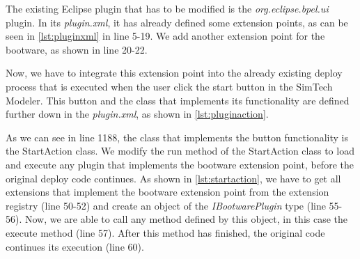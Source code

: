 The existing Eclipse plugin that has to be modified is the \textit{org.eclipse.bpel.ui} plugin.
In its \textit{plugin.xml}, it has already defined some extension points, as can be seen in \autoref{lst:pluginxml} in line 5-19.
We add another extension point for the bootware, as shown in line 20-22.

\vspace*{\baselineskip}

Now, we have to integrate this extension point into the already existing deploy process that is executed when the user click the start button in the SimTech Modeler.
This button and the class that implements its functionality are defined further down in the \textit{plugin.xml}, as shown in \autoref{lst:pluginaction}.

\vspace*{\baselineskip}

As we can see in line 1188, the class that implements the button functionality is the StartAction class.
We modify the run method of the StartAction class to load and execute any plugin that implements the bootware extension point, before the original deploy code continues.
As shown in \autoref{lst:startaction}, we have to get all extensions that implement the bootware extension point from the extension registry (line 50-52) and create an object of the \textit{IBootwarePlugin} type (line 55-56).
Now, we are able to call any method defined by this object, in this case the execute method (line 57).
After this method has finished, the original code continues its execution (line 60).

\vspace*{\baselineskip}

